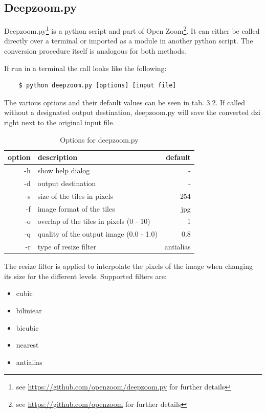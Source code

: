 \subsection{Deepzoom.py}

Deepzoom.py\footnote{see \url{https://github.com/openzoom/deepzoom.py} for further details} is a python script and part of Open Zoom\footnote{see \url{https://github.com/openzoom} for further details}. It can either be called directly over a terminal or imported as a module in another python script. The conversion procedure itself is analogous for both methods.

If run in a terminal the call looks like the following:

\begin{lstlisting}
	$ python deepzoom.py [options] [input file]
\end{lstlisting}

The various options and their default values can be seen in tab. 3.2. If called without a designated output destination, deepzoom.py will save the converted dzi right next to the original input file.

\begin{table}[H]
	\begin{center}
		\begin{tabular}{| r | l | r |}
			\hline
			\textbf{option} & \textbf{description} & \textbf{default} \\ \hline
			-h & show help dialog & - \\ \hline
			-d & output destination & - \\ \hline
			-s & size of the tiles in pixels & 254 \\ \hline
			-f & image format of the tiles & jpg\\ \hline
			-o & overlap of the tiles in pixels (0 - 10) & 1 \\ \hline
			-q & quality of the output image (0.0 - 1.0) & 0.8 \\ \hline
			-r & type of resize filter & antialias \\ \hline
		\end{tabular}
		\caption{Options for deepzoom.py}
	\end{center}
\end{table}

The resize filter is applied to interpolate the pixels of the image when changing its size for the different levels. Supported filters are:

\begin{itemize}
	\item cubic
	\item biliniear
	\item bicubic
	\item nearest
	\item antialias
\end{itemize}

